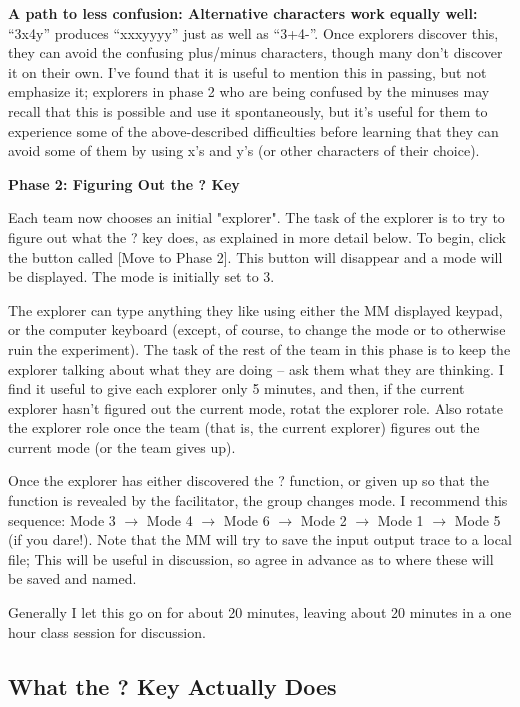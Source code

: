 \documentclass[12pt,letterpaper]{article}
\begin{document}
\textbf{A path to less confusion: Alternative characters work equally well:} ``3x4y'' produces ``xxxyyyy'' just as well as ``3+4-''. Once explorers discover this, they can avoid the confusing plus/minus characters, though many don't discover it on their own. I've found that it is useful to mention this in passing, but not emphasize it; explorers in phase 2 who are being confused by the minuses may recall that this is possible and use it spontaneously, but it's useful for them to experience some of the above-described difficulties before learning that they can avoid some of them by using x's and y's (or other characters of their choice).

\textbf{Phase 2: Figuring Out the ? Key}

Each team now chooses an initial "explorer". The task of the explorer is to try to figure out what the ? key does, as explained in more detail below. To begin, click the button called [Move to Phase 2]. This button will disappear and a mode will be displayed. The mode is initially set to 3.

The explorer can type anything they like using either the MM displayed keypad, or the computer keyboard (except, of course, to change the mode or to otherwise ruin the experiment). The task of the rest of the team in this phase is to keep the explorer talking about what they are doing -- ask them what they are thinking. I find it useful to give each explorer only 5 minutes, and then, if the current explorer hasn't figured out the current mode, rotat the explorer role. Also rotate the explorer role once the team (that is, the current explorer) figures out the current mode (or the team gives up).

Once the explorer has either discovered the ? function, or given up so that the function is revealed by the facilitator, the group changes mode. I recommend this sequence: Mode 3 $\rightarrow$ Mode 4 $\rightarrow$ Mode 6 $\rightarrow$ Mode 2 $\rightarrow$ Mode 1 $\rightarrow$ Mode 5 (if you dare!). Note that the MM will try to save the input output trace to a local file; This will be useful in discussion, so agree in advance as to where these will be saved and named.  

Generally I let this go on for about 20 minutes, leaving about 20 minutes in a one hour class session for discussion.

\subsection{What the ? Key Actually Does}
\end{document}
